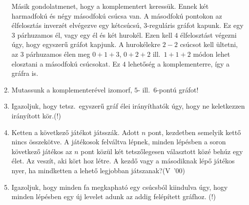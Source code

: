 \documentclass[a4paper]{article}
\newcommand{\0}{{\bf 0}}
\begin{document}
\begin{enumerate}
{    Másik gondolatmenet, hogy a komplementert keressük. Ennek két harmadfokú
    és négy másodfokú csúcsa van. A másodfokú pontokon az élfelosztás inverzét
    elvégezve egy kétcsúcsú, $3$-reguláris gráfot kapunk. Ez egy $3$ párhuzamos
    él, vagy egy él és két hurokél. Ezen kell $4$ élfelosztást végezni úgy,
    hogy egyszerű gráfot kapjunk. A hurokélekre $2-2$ csúcsot kell ültetni, az
    $3$ párhuzamos élen meg $0+1+3$, $0+2+2$ ill.\ $1+1+2$ módon lehet
    elosztani a másodfokú csúcsokat. Ez $4$ lehetőség a komplementerre, így a
    gráfra is.
    }
    \fi
    
    
    \item
    Mutassunk a komplementerével izomorf, $5$- ill.\ $6$-pontú gráfot!
    
    
    
    
    \item
    Igazoljuk, hogy tetsz.\ egyszerű gráf élei irányíthatók úgy, hogy ne
    keletkezzen irányított kör.(!) 
    
    
    
    
    \item
    Ketten a következő játékot játsszák. Adott $n$ pont, kezdetben semelyik
    kettő nincs összekötve. A játékosok felváltva lépnek, minden lépésben a
    soron következő játékos az $n$ pont közül két tetszőlegesen választott közé
    behúz egy élet. Az veszít, aki kört hoz létre. A kezdő vagy a másodiknak
    lépő játékos nyer, ha mindketten a lehető legjobban
    játszanak?\hspace*{0em}\hfill\hbox{(V '00)}
    
    
    
    \item
    Igazoljuk, hogy minden fa megkapható egy csúcsból kiindulva úgy, hogy
    minden lépésben egy új levelet adunk az addig felépített gráfhoz. (!)
    
\end{enumerate}
\end{document}
